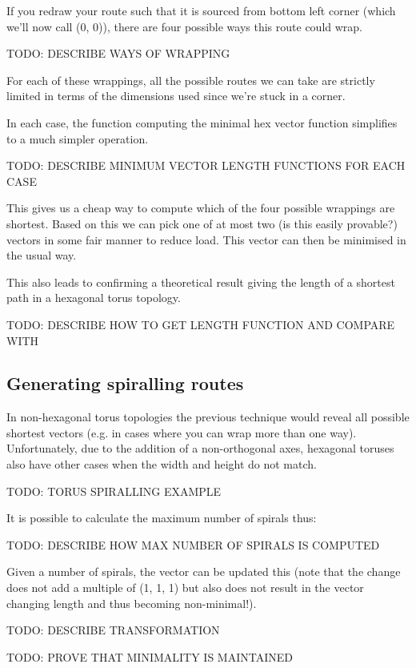 			If you redraw your route such that it is sourced from bottom left corner
			(which we'll now call (0, 0)), there are four possible ways this route
			could wrap.
			
			TODO: DESCRIBE WAYS OF WRAPPING
			
			For each of these wrappings, all the possible routes we can take are
			strictly limited in terms of the dimensions used since we're stuck in a
			corner.
			
			In each case, the function computing the minimal hex vector function
			simplifies to a much simpler operation.
			
			TODO: DESCRIBE MINIMUM VECTOR LENGTH FUNCTIONS FOR EACH CASE
			
			This gives us a cheap way to compute which of the four possible wrappings
			are shortest. Based on this we can pick one of at most two (is this
			easily provable?) vectors in some fair manner to reduce load. This vector
			can then be minimised in the usual way.
			
			This also leads to confirming a theoretical result giving the length of a
			shortest path in a hexagonal torus topology.
			
			TODO: DESCRIBE HOW TO GET LENGTH FUNCTION AND COMPARE WITH \cite{xiao04}
		
		\subsection{Generating spiralling routes}
			
			In non-hexagonal torus topologies the previous technique would reveal all
			possible shortest vectors (e.g. in cases where you can wrap more than one
			way). Unfortunately, due to the addition of a non-orthogonal axes,
			hexagonal toruses also have other cases when the width and height do not
			match.
			
			TODO: TORUS SPIRALLING EXAMPLE
			
			It is possible to calculate the maximum number of spirals thus:
			
			TODO: DESCRIBE HOW MAX NUMBER OF SPIRALS IS COMPUTED
			
			Given a number of spirals, the vector can be updated this (note that the
			change does not add a multiple of (1, 1, 1) but also does not result in
			the vector changing length and thus becoming non-minimal!).
			
			TODO: DESCRIBE TRANSFORMATION
			
			TODO: PROVE THAT MINIMALITY IS MAINTAINED
		
